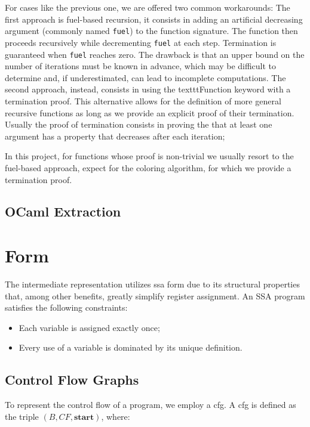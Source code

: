 For cases like the previous one, we are offered two common workarounds:
The first approach is fuel-based recursion, it consists in adding an artificial decreasing argument (commonly named \texttt{fuel}) to the function signature. The function then proceeds recursively while decrementing \texttt{fuel} at each step. Termination is guaranteed when \texttt{fuel} reaches zero. The drawback is that an upper bound on the number of iterations must be known in advance, which may be difficult to determine and, if underestimated, can lead to incomplete computations.
The second approach, instead, consists in using the texttt{Function} keyword with a termination proof. This alternative allows for the definition of more general recursive functions as long as we provide an explicit proof of their termination. Usually the proof of termination consists in proving the that at least one argument has a property that decreases after each iteration;

In this project, for functions whose proof is non-trivial we usually resort to the fuel-based approach, expect for the coloring algorithm, for which we provide a termination proof.

\subsection{OCaml Extraction}
\label{subsec:extract}

\section{ Form}
\label{sec:ssa}

The intermediate representation utilizes \gls{ssa} form due to its structural properties that, among other benefits, greatly simplify register assignment. An SSA program satisfies the following constraints:

\begin{itemize}
    \item Each variable is assigned exactly once;
    \item Every use of a variable is dominated by its unique definition.
\end{itemize}

\subsection{Control Flow Graphs}
\label{subsec:cfg}

To represent the control flow of a program, we employ a \gls{cfg}. A \gls{cfg} is defined as the triple $(B, CF, \textbf{start})$, where:

